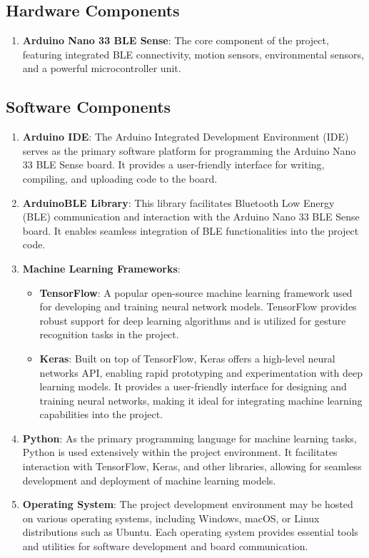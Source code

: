 \subsection*{Hardware Components}

\begin{enumerate}[label=\arabic*.]
    \item \textbf{Arduino Nano 33 BLE Sense}: The core component of the project, featuring integrated BLE connectivity, motion sensors, environmental sensors, and a powerful microcontroller unit.
\end{enumerate}

\subsection*{Software Components}

\begin{enumerate}[label=\arabic*.]
    \item \textbf{Arduino IDE}: The Arduino Integrated Development Environment (IDE) serves as the primary software platform for programming the Arduino Nano 33 BLE Sense board. It provides a user-friendly interface for writing, compiling, and uploading code to the board.
    
    \item \textbf{ArduinoBLE Library}: This library facilitates Bluetooth Low Energy (BLE) communication and interaction with the Arduino Nano 33 BLE Sense board. It enables seamless integration of BLE functionalities into the project code.
    
    \item \textbf{Machine Learning Frameworks}:
    \begin{itemize}
        \item \textbf{TensorFlow}: A popular open-source machine learning framework used for developing and training neural network models. TensorFlow provides robust support for deep learning algorithms and is utilized for gesture recognition tasks in the project.
        \item \textbf{Keras}: Built on top of TensorFlow, Keras offers a high-level neural networks API, enabling rapid prototyping and experimentation with deep learning models. It provides a user-friendly interface for designing and training neural networks, making it ideal for integrating machine learning capabilities into the project.
    \end{itemize}
    
    \item \textbf{Python}: As the primary programming language for machine learning tasks, Python is used extensively within the project environment. It facilitates interaction with TensorFlow, Keras, and other libraries, allowing for seamless development and deployment of machine learning models.
    
    \item \textbf{Operating System}: The project development environment may be hosted on various operating systems, including Windows, macOS, or Linux distributions such as Ubuntu. Each operating system provides essential tools and utilities for software development and board communication.
\end{enumerate}

